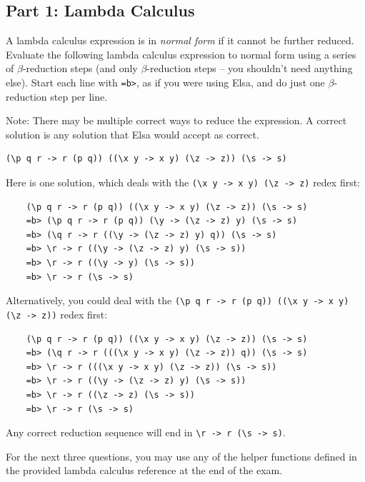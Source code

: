 \documentclass[addpoints]{exam}
\begin{document}
\begin{questions}

\subsection*{\textbf{Part 1: Lambda Calculus}}

\question[5] A lambda calculus expression is in \emph{normal form} if it cannot be further reduced.  Evaluate the following lambda calculus expression to normal form using a series of $\beta$-reduction steps (and only $\beta$-reduction steps -- you shouldn't need anything else).  Start each line with \texttt{=b>}, as if you were using Elsa, and do just one $\beta$-reduction step per line.

Note: There may be multiple correct ways to reduce the expression.  A correct solution is any solution that Elsa would accept as correct.

\begin{verbatim}
(\p q r -> r (p q)) ((\x y -> x y) (\z -> z)) (\s -> s)
\end{verbatim}
\begin{solutionorbox}[5in]
Here is one solution, which deals with the \verb|(\x y -> x y) (\z -> z)| redex first:
\begin{verbatim}
    (\p q r -> r (p q)) ((\x y -> x y) (\z -> z)) (\s -> s)
    =b> (\p q r -> r (p q)) (\y -> (\z -> z) y) (\s -> s)
    =b> (\q r -> r ((\y -> (\z -> z) y) q)) (\s -> s)
    =b> \r -> r ((\y -> (\z -> z) y) (\s -> s))
    =b> \r -> r ((\y -> y) (\s -> s))
    =b> \r -> r (\s -> s)
\end{verbatim}
Alternatively, you could deal with the \verb|(\p q r -> r (p q)) ((\x y -> x y) (\z -> z))| redex first:
\begin{verbatim}
    (\p q r -> r (p q)) ((\x y -> x y) (\z -> z)) (\s -> s)
    =b> (\q r -> r (((\x y -> x y) (\z -> z)) q)) (\s -> s)
    =b> \r -> r (((\x y -> x y) (\z -> z)) (\s -> s))
    =b> \r -> r ((\y -> (\z -> z) y) (\s -> s))
    =b> \r -> r ((\z -> z) (\s -> s))
    =b> \r -> r (\s -> s)
\end{verbatim}
Any correct reduction sequence will end in \verb|\r -> r (\s -> s)|.
\end{solutionorbox}

\newpage

For the next three questions, you may use any of the helper functions defined in the provided lambda calculus reference at the end of the exam.

\question[4]


\end{questions}
\end{document}
